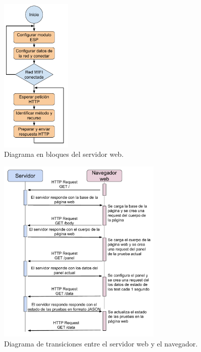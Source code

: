 \begin{figure}[H]
	\centering
	\includegraphics[width=0.3\textwidth]{./Figures/BloquesServidor.pdf}
	\caption{Diagrama en bloques del servidor web.}
	\label{fig:BloquesServidor}
\end{figure}

\begin{figure}[H]
	\centering
	\includegraphics[width=0.7\textwidth]{./Figures/TransaccionesHTTP.pdf}
	\caption{Diagrama de transiciones entre el servidor web y el navegador.}
	\label{fig:TransaccionesHTTP}
\end{figure}

